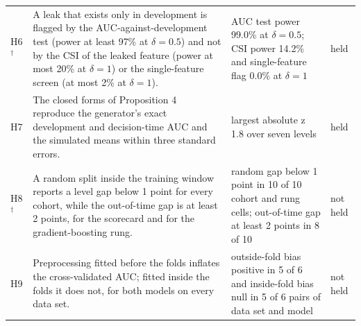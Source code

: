 \begin{table}[htbp]
{\begin{tabular}{lp{7.2cm}p{4.6cm}l}
\relax H6$^{\dagger}$ & \relax A leak that exists only in development is flagged by the AUC-against-development test (power at least 97\% at $\delta=0.5$) and not by the CSI of the leaked feature (power at most 20\% at $\delta=1$) or the single-feature screen (at most 2\% at $\delta=1$). & \relax AUC test power 99.0\% at $\delta=0.5$; CSI power 14.2\% and single-feature flag 0.0\% at $\delta=1$ & held \\
H7 & The closed forms of Proposition 4 reproduce the generator's exact development and decision-time AUC and the simulated means within three standard errors. & largest absolute z 1.8 over seven levels & held \\
\relax H8$^{\dagger}$ & A random split inside the training window reports a level gap below 1 point for every cohort, while the out-of-time gap is at least 2 points, for the scorecard and for the gradient-boosting rung. & random gap below 1 point in 10 of 10 cohort and rung cells; out-of-time gap at least 2 points in 8 of 10 & not held \\
H9 & Preprocessing fitted before the folds inflates the cross-validated AUC; fitted inside the folds it does not, for both models on every data set. & outside-fold bias positive in 5 of 6 and inside-fold bias null in 5 of 6 pairs of data set and model & not held \\
\bottomrule
\end{tabular}%
}
\end{table}
